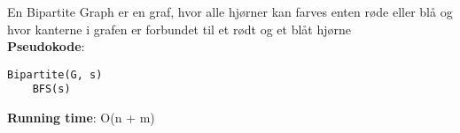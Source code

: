 En Bipartite Graph er en graf, hvor alle hjørner kan farves enten røde eller blå og hvor kanterne i grafen er forbundet til et rødt og et blåt hjørne\\
\textbf{Pseudokode}:
\begin{lstlisting}[frame=single, mathescape=true]
Bipartite(G, s)
	BFS(s)
\end{lstlisting}
\textbf{Running time}: O(n + m)
